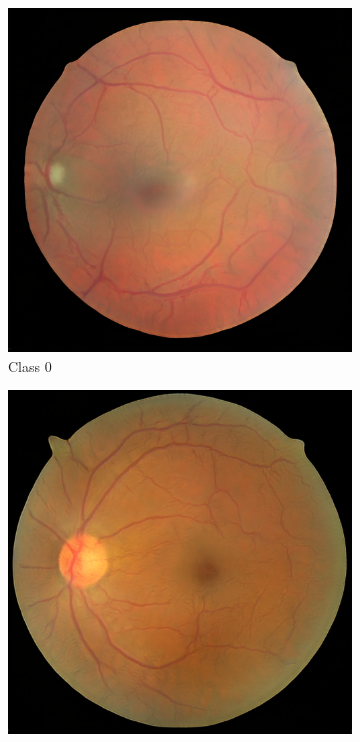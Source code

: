\documentclass[sigconf,nonacm]{acmart}
\begin{document}
\begin{figure}[H]
\centering
\begin{subfigure}{0.18\linewidth}
\centering
\includegraphics[width=0.9\linewidth]{fake-class0.png}
\caption{Class 0}
\end{subfigure}
\begin{subfigure}{0.18\linewidth}
\centering
\includegraphics[width=0.9\linewidth]{fake-class1.png}

\end{subfigure}
\end{figure}
\end{document}
